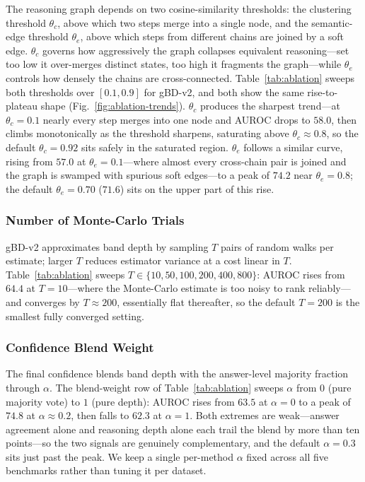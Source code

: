 \documentclass[11pt]{article}
\begin{document}
The reasoning graph depends on two cosine-similarity thresholds: the clustering
threshold $\theta_c$, above which two steps merge into a single node, and the
semantic-edge threshold $\theta_e$, above which steps from different chains are
joined by a soft edge. $\theta_c$ governs how aggressively the graph collapses
equivalent reasoning---set too low it over-merges distinct states, too high it
fragments the graph---while $\theta_e$ controls how densely the chains are
cross-connected. Table~\ref{tab:ablation} sweeps both thresholds over $[0.1, 0.9]$
for gBD-v2, and both show the same rise-to-plateau shape
(Fig.~\ref{fig:ablation-trends}). $\theta_c$ produces the sharpest trend---at
$\theta_c{=}0.1$ nearly every step merges into one node and AUROC drops to $58.0$,
then climbs monotonically as the threshold sharpens, saturating above
$\theta_c{\approx}0.8$, so the default $\theta_c{=}0.92$ sits safely in the
saturated region. $\theta_e$ follows a similar curve, rising from $57.0$ at
$\theta_e{=}0.1$---where almost every cross-chain pair is joined and the graph is
swamped with spurious soft edges---to a peak of $74.2$ near $\theta_e{=}0.8$; the
default $\theta_e{=}0.70$ ($71.6$) sits on the upper part of this rise.

\subsubsection{Number of Monte-Carlo Trials}
\label{sec:exp:ablation:trials}

gBD-v2 approximates band depth by sampling $T$ pairs of random walks per estimate;
larger $T$ reduces estimator variance at a cost linear in $T$.
Table~\ref{tab:ablation} sweeps $T \in \{10, 50, 100, 200, 400, 800\}$: AUROC rises
from $64.4$ at $T{=}10$---where the Monte-Carlo estimate is too noisy to rank
reliably---and converges by $T{\approx}200$, essentially flat thereafter, so the
default $T{=}200$ is the smallest fully converged setting.

\subsubsection{Confidence Blend Weight}
\label{sec:exp:ablation:alpha}

The final confidence blends band depth with the answer-level majority fraction
through $\alpha$. The blend-weight row of Table~\ref{tab:ablation} sweeps $\alpha$
from $0$ (pure majority vote) to $1$ (pure depth): AUROC rises from $63.5$ at
$\alpha{=}0$ to a peak of $74.8$ at $\alpha{\approx}0.2$, then falls to $62.3$ at
$\alpha{=}1$. Both extremes are weak---answer agreement alone and reasoning depth
alone each trail the blend by more than ten points---so the two signals are
genuinely complementary, and the default $\alpha{=}0.3$ sits just past the peak.
We keep a single per-method $\alpha$ fixed across all five benchmarks rather than
tuning it per dataset.
\end{document}
